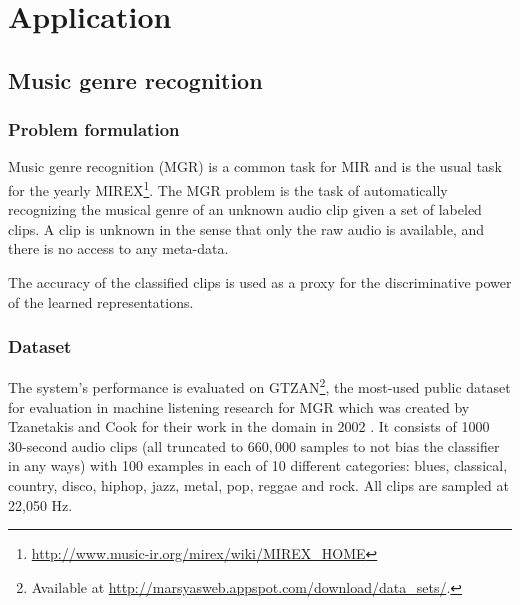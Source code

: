 \part{Application} \label{part:application}

\chapter{Music genre recognition} \label{chap:MGR}

\section{Problem formulation}

Music genre recognition (MGR) is a common task for \gls{MIR} and is the usual task for the yearly \gls{MIREX}\footnote{\url{http://www.music-ir.org/mirex/wiki/MIREX_HOME}}. The \gls{MGR} problem is the task of automatically recognizing the musical genre of an unknown audio clip given a set of labeled clips. A clip is unknown in the sense that only the raw audio is available, and there is no access to any meta-data.

The accuracy of the classified clips is used as a proxy for the discriminative power of the learned representations.

\section{Dataset}

The system's performance is evaluated on GTZAN\footnote{Available at \url{http://marsyasweb.appspot.com/download/data\_sets/}.}, the most-used public dataset for evaluation in machine listening research for \gls{MGR} \cite{sturm2014survey} which was created by Tzanetakis and Cook for their work in the domain in 2002 \cite{tzanetakis2002GTZAN}. It consists of 1000 30-second audio clips (all truncated to $660,000$ samples to not bias the classifier in any ways) with 100 examples in each of 10 different categories: blues, classical, country, disco, hiphop, jazz, metal, pop, reggae and rock. All clips are sampled at 22,050 Hz.

